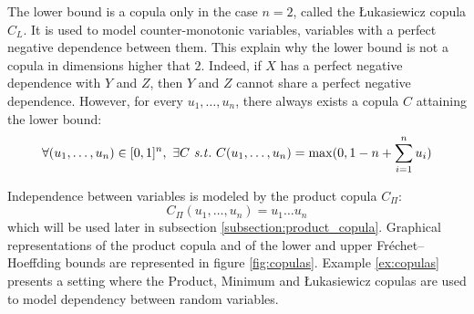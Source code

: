 The lower bound is a copula only in the case $n=2$, called the \L ukasiewicz copula $C_L$. It is used to model counter-monotonic variables, \ie variables with a perfect negative dependence between them. This explain why the lower bound is not a copula in dimensions higher that $2$. Indeed, if $X$ has a perfect negative dependence with $Y$ and $Z$, then $Y$ and $Z$ cannot share a perfect negative dependence. However, for every $u_1,\dots,u_n$, there always exists a copula $C$ attaining the lower bound:
\begin{eqnarray*}
    \forall (u_1,\dots,u_n)\in[0,1]^n,~\exists C \text{ \st }~C(u_1,\dots,u_n) = \max(0, 1-n+\sum_{i=1}^n u_i)
\end{eqnarray*}
 
Independence between variables is modeled by the product copula $C_\Pi$:
\begin{equation*}
    C_\Pi(u_1, \dots, u_n)=u_1\dots u_n
\end{equation*}
which will be used later in subsection \ref{subsection:product_copula}. Graphical representations of the product copula and of the lower and upper Fréchet–Hoeffding bounds are represented in figure \ref{fig:copulas}. Example \ref{ex:copulas} presents a setting where the Product, Minimum and \L ukasiewicz copulas are used to model dependency between random variables.

